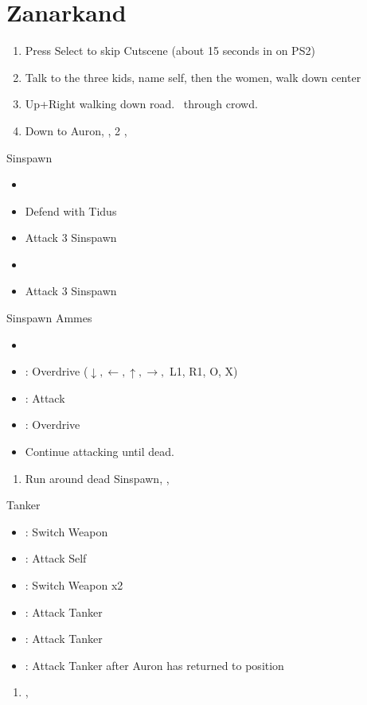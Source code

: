 \chapter{Zanarkand}

\begin{enumerate}
	\item Press Select to skip Cutscene (about 15 seconds in on PS2)
	\item Talk to the three kids, name self, then the women, walk down center
	\item Up+Right walking down road. \sd \ through crowd. \skippablefmv[2:30]
	\item Down to Auron, \sd, 2 \skippablecs[2:30], \sd
\end{enumerate}
\begin{battle}{Sinspawn}
	\begin{itemize}
		\item \sd
		\item Defend with Tidus
		\item Attack 3 Sinspawn
		\item \sd
		\item Attack 3 Sinspawn
	\end{itemize}
\end{battle}
\begin{battle}[2400]{Sinspawn Ammes}
	\begin{itemize}
		\item \sd
		\item \auron: Overdrive ($\downarrow, \leftarrow, \uparrow, \rightarrow,$ L1, R1, O, X)
		\item \tidus: Attack
		\item \tidus: Overdrive
		\item Continue attacking until dead.
	\end{itemize}
\end{battle}
\begin{enumerate}[resume]
	\item Run around dead Sinspawn, \save, \sd
\end{enumerate}
\begin{battle}[1000]{Tanker}
	\begin{itemize}
		\item \tidus: Switch Weapon
		\item \auron: Attack Self
		\item \tidus: Switch Weapon x2
		\item \tidus: Attack Tanker
		\item \auron: Attack Tanker
		\item \tidus: Attack Tanker after Auron has returned to position
	\end{itemize}
\end{battle}
\begin{enumerate}[resume]
	\item \cs[2:00], \skippablefmv
\end{enumerate}